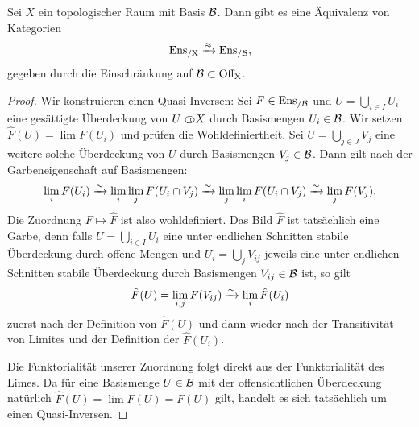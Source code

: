 \begin{satz} \label{sheaf-on-basis}
  Sei $X$ ein topologischer Raum mit Basis $\mathcal{B}$. Dann gibt es eine
  Äqui\-va\-lenz von Kategorien
  \[ \operatorname{Ens_{/X}} \xrightarrow{\approx} \operatorname{Ens_{/\mathcal{B}}} , \]
  gegeben durch die Einschränkung auf $\mathcal{B} \subset \operatorname{Off_X}$.
\end{satz}
\begin{proof}
  Wir konstruieren einen Quasi-Inversen: Sei $F \in \operatorname{Ens_{/\mathcal{B}}}$ und $U =
  \bigcup_{i \in I} U_i$ eine gesättigte Überdeckung von $U \subset\kern-0.58em\circ X$
  durch Basismengen $U_i \in \mathcal{B}$. Wir setzen $\hat{F}(U) = \lim
  F(U_i)$ und prüfen die Wohldefiniertheit. Sei $U = \bigcup_{j \in J}
  V_j$ eine weitere solche Überdeckung von $U$ durch Basismengen $V_j
  \in \mathcal{B}$. Dann gilt nach der Garbeneigenschaft auf Basismengen:
  \[ \lim_i F(U_i)
  \xrightarrow[]{\sim} \lim_i \lim_j F(U_i \cap V_j)
  \xrightarrow[]{\sim} \lim_j \lim_i F(U_i \cap V_j)
  \xrightarrow[]{\sim} \lim_j F(V_j) .
  \]
  Die Zuordnung $F \mapsto \hat{F}$ ist also wohldefiniert. Das Bild
  $\hat{F}$ ist tatsächlich eine Garbe, denn falls $U = \bigcup_{i \in
    I} U_i$ eine unter endlichen Schnitten stabile Überdeckung durch
  offene Mengen und $U_i = \bigcup_{j} V_{ij}$ jeweils eine unter
  endlichen Schnitten stabile Überdeckung durch Basismengen $V_{ij}
  \in \mathcal{B}$ ist, so gilt
  \[ \hat{F}(U) = \lim_{i,j} F(V_{ij}) \xrightarrow[]{\sim} \lim_i \hat{F}(U_i) \]
  zuerst nach der Definition von $\hat{F}(U)$ und dann wieder nach der
  Transitivität von Limites und der Definition der $\hat{F}(U_i)$.
  
  Die Funktorialität unserer Zuordnung folgt direkt aus der
  Funktorialität des Limes. Da für eine Basismenge $U \in \mathcal{B}$ mit der
  offensichtlichen Überdeckung natürlich $\hat{F}(U) = \lim F(U) =
  F(U) $ gilt, handelt es sich tatsächlich um einen Quasi-Inversen.
\end{proof}


